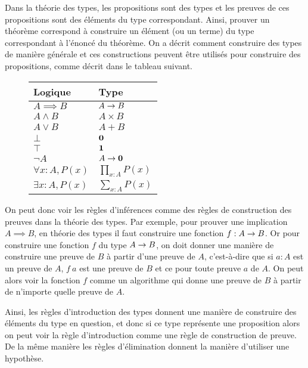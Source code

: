 \documentclass[../../rapport.tex]{subfiles}
\begin{document}
  Dans la théorie des types, les propositions sont des types et les preuves de ces propositions sont des éléments du type correspondant.
  Ainsi, prouver un théorème correspond à construire un élément (ou un terme) du type correspondant à l'énoncé du théorème.
  On a décrit comment construire des types de manière générale et ces constructions peuvent être utilisés pour construire des propositions,
  comme décrit dans le tableau suivant.

  \begin{figure}[ht]
    \centering
    \begin{tabular}{m{3cm} l}
      Logique & Type \vspace{0.4em} \\
      \hline
      \vspace{0.6em}
      $A \implies B$ & $A \rightarrow B$ \\
      $A \wedge B$ & $A \times B$ \\
      $A \vee B$ & $A + B$ \\
      $\bot$ & $\operatorname{\textbf{0}}$ \\
      $\top$ & $\operatorname{\textbf{1}}$ \\
      $\neg A$ & $A \rightarrow \operatorname{\textbf{0}}$ \vspace{0.2em}\\
      \hline \vspace{0.5em}
      $\forall x : A, P(x)$ & $\prod_{x:A}P(x)$ \\
      $\exists x : A, P(x)$ & $\sum_{x:A}P(x)$ \\
    \end{tabular}
  \end{figure}

  On peut donc voir les règles d'inférences comme des règles de construction des preuves dans la théorie des types.
  Par exemple, pour prouver une implication $A \implies B$, en théorie des types il faut construire une fonction $f : A \rightarrow B$.
  Or pour construire une fonction $f$ du type $A \rightarrow B$,
  on doit donner une manière de construire une preuve de $B$ à partir d'une preuve de $A$,
  c'est-à-dire que si $a : A$ est un preuve de $A$, $f\ a$ est une preuve de $B$ et ce pour toute preuve $a$ de $A$.
  On peut alors voir la fonction $f$ comme un algorithme qui donne une preuve de $B$ à partir de n'importe quelle preuve de $A$.

  Ainsi, les règles d'introduction des types donnent une manière de construire des éléments du type en question,
  et donc si ce type représente une proposition alors on peut voir la règle d'introduction comme une règle de construction de preuve.
  De la même manière les règles d'élimination donnent la manière d'utiliser une hypothèse.
\end{document}
